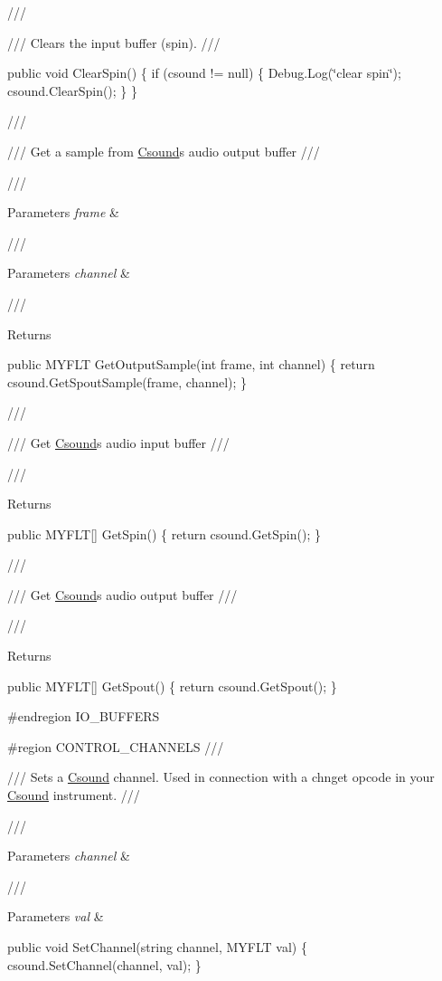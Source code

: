 /// 

/// Clears the input buffer (spin). /// 

public void Clear\+Spin() \{ if (csound != null) \{ Debug.\+Log(\char`\"{}clear spin\char`\"{}); csound.\+Clear\+Spin(); \} \}

/// 

/// Get a sample from \mbox{\hyperlink{namespace_csound}{Csound}}\textquotesingle{}s audio output buffer /// 

/// 
\begin{DoxyParams}{Parameters}
{\em frame} & \\
\hline
\end{DoxyParams}
/// 
\begin{DoxyParams}{Parameters}
{\em channel} & \\
\hline
\end{DoxyParams}
/// \begin{DoxyReturn}{Returns}

\end{DoxyReturn}
public MYFLT Get\+Output\+Sample(int frame, int channel) \{ return csound.\+Get\+Spout\+Sample(frame, channel); \}

/// 

/// Get \mbox{\hyperlink{namespace_csound}{Csound}}\textquotesingle{}s audio input buffer /// 

/// \begin{DoxyReturn}{Returns}

\end{DoxyReturn}
public MYFLT\mbox{[}\mbox{]} Get\+Spin() \{ return csound.\+Get\+Spin(); \}

/// 

/// Get \mbox{\hyperlink{namespace_csound}{Csound}}\textquotesingle{}s audio output buffer /// 

/// \begin{DoxyReturn}{Returns}

\end{DoxyReturn}
public MYFLT\mbox{[}\mbox{]} Get\+Spout() \{ return csound.\+Get\+Spout(); \}

\#endregion IO\+\_\+\+BUFFERS

\#region CONTROL\+\_\+\+CHANNELS /// 

/// Sets a \mbox{\hyperlink{namespace_csound}{Csound}} channel. Used in connection with a chnget opcode in your \mbox{\hyperlink{namespace_csound}{Csound}} instrument. /// 

/// 
\begin{DoxyParams}{Parameters}
{\em channel} & \\
\hline
\end{DoxyParams}
/// 
\begin{DoxyParams}{Parameters}
{\em val} & \\
\hline
\end{DoxyParams}
public void Set\+Channel(string channel, MYFLT val) \{ csound.\+Set\+Channel(channel, val); \}

